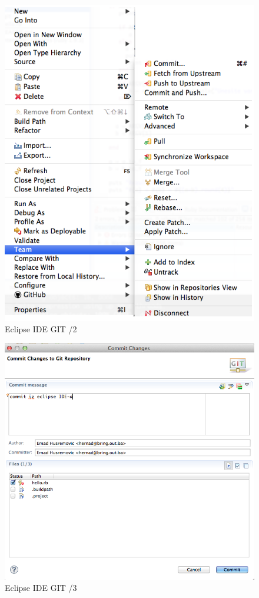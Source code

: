 \documentclass[times, utf8, seminar]{fit}
\begin{document}
\begin{figure}[H]
\centering
\includegraphics[width=15cm]{img/eclipse_git_02.png}
\caption{Eclipse IDE GIT /2}
\end{figure}

\begin{figure}[H]
\centering
\includegraphics[width=15cm]{img/eclipse_git_03.png}
\caption{Eclipse IDE GIT /3}
\end{figure}
\end{document}
